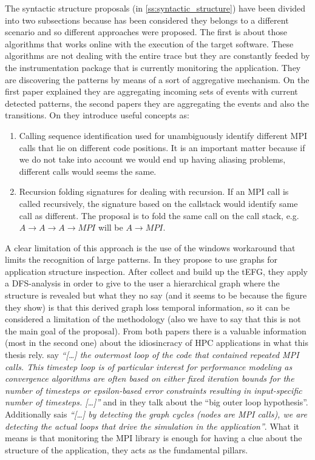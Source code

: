 The syntactic structure proposals (in \ref{ss:syntactic_structure}) have been 
divided into two subsections because has been considered they belongs to a 
different scenario and so different approaches were proposed. The
first is about those algorithms that works online with the execution of the
target software. These algorithms are not dealing with the entire trace but they
are constantly feeded by the instrumentation package that is currently monitoring 
the application. They are discovering the patterns by means of a sort of
aggregative mechanism. On the first paper explained they are aggregating
incoming sets of events with current detected patterns, the second papers they
are aggregating the events and also the transitions. On
\cite{noeth2009scalatrace} they introduce useful concepts as:
\begin{enumerate}[label=\roman*)]
  \item Calling sequence identification used for unambiguously identify
different MPI calls that lie on different code positions. It is an important
matter because if we do not take into account we would end up having aliasing
problems, different calls would seems the same. 
  \item Recursion folding signatures for dealing with recursion. If an MPI call 
    is called recursively, the signature based on the callstack would identify
    same call as different. The proposal is to fold the same call on the call
    stack, e.g. $A\rightarrow A \rightarrow A \rightarrow MPI$ will be $A
    \rightarrow MPI$.
\end{enumerate}
A clear limitation of this approach is the use of the windows workaround
that limits the recognition of large patterns. In \cite{aguilar2016event}
they propose to use graphs for application structure inspection. After collect
and build up the tEFG, they apply a DFS-analysis in order to give to the user
a hierarchical graph where the structure is revealed but what they no say (and
it seems to be because the figure they show) is that this derived graph loss
temporal information, so it can be considered a limitation of the methodology
(also we have to say that this is not the main goal of the proposal). From both
papers there is a valuable information (most in the second one) about the
idiosincracy of HPC applications in what this thesis rely.
\cite{noeth2009scalatrace} say \textit{``[\ldots] the outermost loop of the code
that contained repeated MPI calls. This timestep loop is of particular interest
for performance modeling as convergence algorithms are often based on either
fixed iteration bounds for the number of timesteps or epsilon-based error 
constraints resulting in input-specific number of timesteps. [\ldots]''} and in \cite{aguilar2016event} they talk
about the ``big outer loop hypothesis''. Additionally sais \textit{``[\ldots] by
detecting the graph cycles (nodes are MPI calls), we are detecting the actual
loops that drive the simulation in the application''}. What it means is that
monitoring the MPI library is enough for having a clue about the structure of
the application, they acts as the fundamental pillars.

